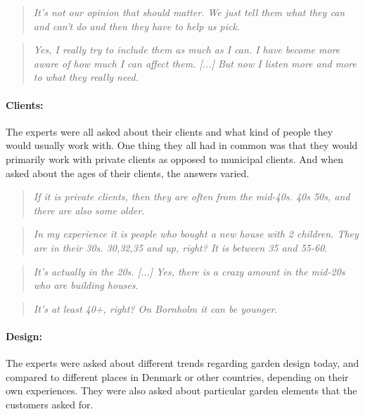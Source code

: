 \begin{quote}
	\textit{It's not our opinion that should matter. We just tell them what they can and can't do and then they have to help us pick}\label{quote:expertProcess2}.\\
\end{quote}

\begin{quote}
	\textit{Yes, I really try to include them as much as I can. I have become more aware of how much I can affect them. [...] But now I listen more and more to what they really need. }\label{quote:expertProcess3}\\
\end{quote}


\paragraph*{Clients:}
The experts were all asked about their clients and what kind of people they would usually work with. One thing they all had in common was that they would primarily work with private clients as opposed to municipal clients. And when asked about the ages of their clients, the answers varied. 

\begin{quote}
	\textit{If it is private clients, then they are often from the mid-40s. 40s 50s, and there are also some older}\label{quote:expertClients1}.\\
\end{quote}

\begin{quote}
	\textit{In my experience it is people who bought a new house with 2 children. They are in their 30s. 30,32,35 and up, right? It is between 35 and 55-60}\label{quote:expertClients2}.\\
\end{quote}

\begin{quote}
	\textit{It's actually in the 20s. [...] Yes, there is a crazy amount in the mid-20s who are building houses}\label{quote:expertClients3}.\\
\end{quote}

\begin{quote}
	\textit{It's at least 40+, right? On Bornholm it can be younger}\label{quote:expertClients4}.\\
\end{quote}


\paragraph*{Design:}
The experts were asked about different trends regarding garden design today, and compared to different places in Denmark or other countries, depending on their own experiences. They were also asked about particular garden elements that the customers asked for.

